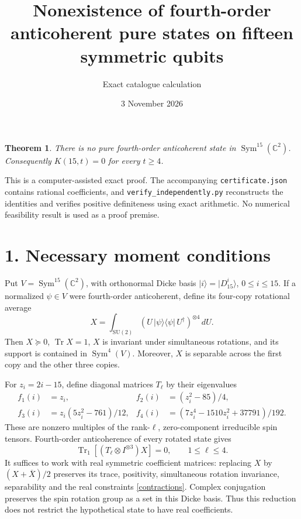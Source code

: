 \documentclass[11pt]{article}
\newtheorem{theorem}{Theorem}
\newcommand{\Tr}{\operatorname{Tr}}
\begin{document}
\title{Nonexistence of fourth-order anticoherent pure states on fifteen symmetric qubits}
\author{Exact catalogue calculation}
\date{3 November 2026}
\maketitle
\begin{theorem}
There is no pure fourth-order anticoherent state in
$\operatorname{Sym}^{15}(\mathbb C^2)$. Consequently
$K(15,t)=0$ for every $t\geq4$.
\end{theorem}
This is a computer-assisted exact proof. The accompanying
\texttt{certificate.json} contains rational coefficients, and
\texttt{verify\_independently.py} reconstructs the identities and verifies
positive definiteness using exact arithmetic. No numerical feasibility result
is used as a proof premise.

\section*{1. Necessary moment conditions}
Put $V=\operatorname{Sym}^{15}(\mathbb C^2)$, with orthonormal Dicke basis
$|i\rangle=|D_{15}^{i}\rangle$, $0\leq i\leq15$.
If a normalized $\psi\in V$ were fourth-order anticoherent, define its
four-copy rotational average
\[
 X=\int_{\mathrm{SU}(2)}
 (U\,|\psi\rangle\langle\psi|\,U^\dagger)^{\otimes4}\,dU.
\]
Then $X\succeq0$, $\Tr X=1$, $X$ is invariant under simultaneous rotations,
and its support is contained in $\operatorname{Sym}^{4}(V)$.
Moreover, $X$ is separable across the first copy and the other three copies.

For $z_i=2i-15$, define diagonal matrices $T_\ell$ by their eigenvalues
\begin{align*}
 f_1(i)&=z_i, &
 f_2(i)&=(z_i^2-85)/4,\\
 f_3(i)&=z_i(5z_i^2-761)/12, &
 f_4(i)&=(7z_i^4-1510z_i^2+37791)/192.
\end{align*}
These are nonzero multiples of the rank-$\ell$, zero-component irreducible
spin tensors. Fourth-order anticoherence of every rotated state gives
\begin{equation}\label{contractions}
 \Tr_1[(T_\ell\otimes I^{\otimes3})X]=0,
 \qquad 1\leq\ell\leq4.
\end{equation}
It suffices to work with real symmetric coefficient matrices: replacing
$X$ by $(X+\overline X)/2$ preserves its trace, positivity, simultaneous
rotation invariance, separability and the real constraints
\eqref{contractions}. Complex conjugation preserves the spin rotation group
as a set in this Dicke basis. Thus this reduction does not restrict the
hypothetical state to have real coefficients.
\end{document}
